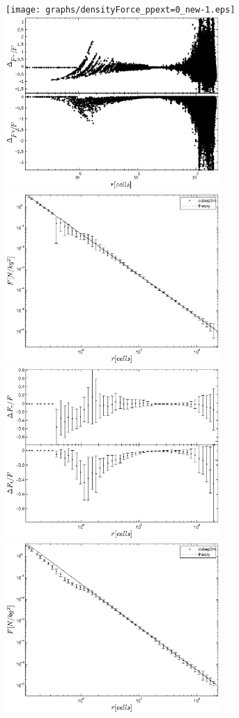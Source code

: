 \begin{figure}%
  \begin{center}
    \texttt{[image: graphs/densityForce\_ppext=0\_new-1.eps]}
    \includegraphics[width=3.2in]{graphs/densityForce_fracErr_ppext=0_new-1.eps}
    \includegraphics[width=3.2in]{graphs/densityForce_ppext=0_rebin_new-1.eps}
    \includegraphics[width=3.2in]{graphs/densityForce_fracErr_ppext=0_rebin_new-1.eps}
    \includegraphics[width=3.2in]{graphs/densityForce_ppext=0_rebin_N10_new-1.eps}

\end{center}
\end{figure}
